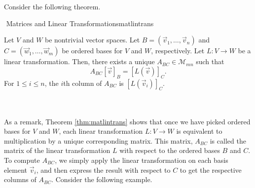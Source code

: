         Consider the following theorem. 
        \begin{theorem}{\Stop\,\,Matrices and Linear Transformations}{matlintrans}
            
            Let \(V\) and \(W\) be nontrivial vector spaces. Let \(B=(\vec{v}_1,\ldots,\vec{v}_n)\) and \(C=(\vec{w}_1,\ldots,\vec{w}_m)\) be ordered bases for \(V\) and \(W\), respectively. Let \(L:V\to W\) be a linear transformation. Then, there exists a unique \(A_{BC}\in\mathcal{M}_{mn}\) such that
            \begin{equation*}
                A_{BC}[\vec{v}]_{B}=[L(\vec{v})]_{C}.
            \end{equation*}
            For \(1\leq i\leq n\), the \(i\)th column of \(A_{BC}\) is \([L(\vec{v}_i)]_C\).

        \end{theorem}
        \vphantom
        \\
        \\
        As a remark, Theorem \ref{thm:matlintrans} shows that once we have picked ordered bases for \(V\) and \(W\), each linear transformation \(L:V\to W\) is equivalent to multiplication by a unique corresponding matrix. This matrix, \(A_{BC}\) is called the matrix of the linear transformation \(L\) with respect to the ordered bases \(B\) and \(C\). To compute \(A_{BC}\), we simply apply the linear transformation on each basis element \(\vec{v}_i\), and then express the result with respect to \(C\) to get the respective columns of \(A_{BC}\). Consider the following example.
